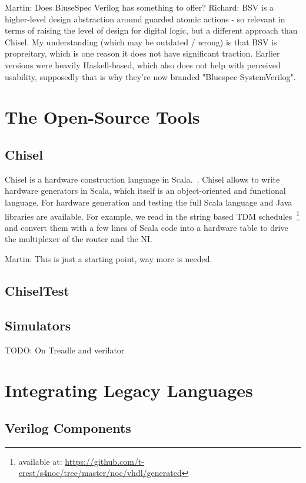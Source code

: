 \documentclass[a4paper, conference]{IEEEtran}
\newcommand{\todo}[1]{{\color{olive} TODO: #1}}
\newcommand{\martin}[1]{{\color{blue} Martin: #1}}
\newcommand{\ducky}[1]{{\color{orange} Richard: #1}}
\begin{document}
\martin{Does BluseSpec Verilog has something to offer?}
\ducky{BSV is a higher-level design abstraction around guarded atomic actions - so relevant in terms of raising the level of design for digital logic, but a different approach than Chisel. My understanding (which may be outdated / wrong) is that BSV is propreitary, which is one reason it does not have significant traction. Earlier versions were heavily Haskell-based, which also does not help with perceived usability, supposedly that is why they're now branded "Bluespec SystemVerilog".}

\section{The Open-Source Tools}

\subsection{Chisel}

Chisel is a hardware construction language in Scala.~\cite{chisel:dac2012}.
Chisel allows to write hardware generators
in Scala, which itself is an object-oriented and functional language.
For hardware generation and testing the full Scala language and Java
libraries are available. For example, we read in the string based TDM
schedules~\footnote{available at: \url{https://github.com/t-crest/s4noc/tree/master/noc/vhdl/generated}}
and convert them with a few lines of Scala code into a hardware table to
drive the multiplexer of the router and the NI.

\martin{This is just a starting point, way more is needed.}

\subsection{ChiselTest}

\subsection{Simulators}

\todo{On Treadle and verilator}


\section{Integrating Legacy Languages}

\subsection{Verilog Components}
\end{document}

